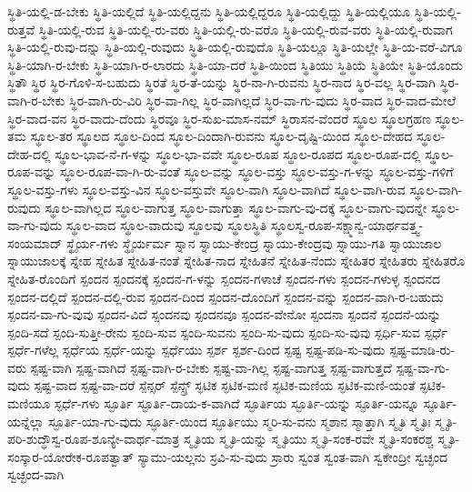 {ಸ್ಥಿತಿ-ಯಲ್ಲಿ-ಡ-ಬೇಕು
ಸ್ಥಿತಿ-ಯಲ್ಲಿದೆ
ಸ್ಥಿತಿ-ಯಲ್ಲಿದ್ದನು
ಸ್ಥಿತಿ-ಯಲ್ಲಿದ್ದರೂ
ಸ್ಥಿತಿ-ಯಲ್ಲಿದ್ದು
ಸ್ಥಿತಿ-ಯಲ್ಲಿಯೂ
ಸ್ಥಿತಿ-ಯಲ್ಲಿ-ರುತ್ತವೆ
ಸ್ಥಿತಿ-ಯಲ್ಲಿ-ರುವ
ಸ್ಥಿತಿ-ಯಲ್ಲಿ-ರು-ವರು
ಸ್ಥಿತಿ-ಯಲ್ಲಿ-ರು-ವರೊ
ಸ್ಥಿತಿ-ಯಲ್ಲಿ-ರುವ-ವರು
ಸ್ಥಿತಿ-ಯಲ್ಲಿ-ರುವಾಗ
ಸ್ಥಿತಿ-ಯಲ್ಲಿ-ರುವು-ದನ್ನು
ಸ್ಥಿತಿ-ಯಲ್ಲಿ-ರುವುದು
ಸ್ಥಿತಿ-ಯಲ್ಲಿ-ರುವುದೊ
ಸ್ಥಿತಿ-ಯಲ್ಲೂ
ಸ್ಥಿತಿ-ಯಲ್ಲೇ
ಸ್ಥಿತಿ-ಯ-ವರೆ-ವಿಗೂ
ಸ್ಥಿತಿ-ಯಾಗಿ-ರ-ಬೇಕು
ಸ್ಥಿತಿ-ಯಾಗಿ-ರ-ಲಾರದು
ಸ್ಥಿತಿ-ಯಾ-ದರೆ
ಸ್ಥಿತಿ-ಯಿಂದ
ಸ್ಥಿತಿಯು
ಸ್ಥಿತಿಯೆ
ಸ್ಥಿತಿಯೇ
ಸ್ಥಿತಿ-ಯೊಂದು
ಸ್ಥಿತೌ
ಸ್ಥಿರ
ಸ್ಥಿರ-ಗೊಳಿ-ಸ-ಬಹುದು
ಸ್ಥಿರತೆ
ಸ್ಥಿರ-ತೆ-ಯನ್ನು
ಸ್ಥಿರ-ನಾ-ಗಿ-ರುವನು
ಸ್ಥಿರ-ನಾದ
ಸ್ಥಿರ-ವಲ್ಲ
ಸ್ಥಿರ-ವಾಗಿ
ಸ್ಥಿರ-ವಾಗಿ-ರ-ಬೇಕು
ಸ್ಥಿರ-ವಾಗಿ-ರು-ವಿರಿ
ಸ್ಥಿರ-ವಾ-ಗಿಲ್ಲ
ಸ್ಥಿರ-ವಾಗಿಲ್ಲದೆ
ಸ್ಥಿರ-ವಾ-ಗು-ವುದು
ಸ್ಥಿರ-ವಾದ
ಸ್ಥಿರ-ವಾದ-ಮೇಲೆ
ಸ್ಥಿರ-ವಾದ-ವನ
ಸ್ಥಿರ-ವಾದು-ದೆಂದು
ಸ್ಥಿರವೂ
ಸ್ಥಿರ-ಸುಖ-ಮಾಸ-ನಮ್
ಸ್ಥಿರಾಸನ-ವೆಂದರೆ
ಸ್ಥೂಲ
ಸ್ಥೂಲಗ್ರಹಣ
ಸ್ಥೂಲ-ತಮ
ಸ್ಥೂಲ-ತರ
ಸ್ಥೂಲದ
ಸ್ಥೂಲ-ದಿಂದ
ಸ್ಥೂಲ-ದಿಂದಾಗಿ-ರುವನು
ಸ್ಥೂಲ-ದೃಷ್ಟಿ-ಯಿಂದ
ಸ್ಥೂಲ-ದೇಹದ
ಸ್ಥೂಲ-ದೇಹ-ದಲ್ಲಿ
ಸ್ಥೂಲ-ಭಾವ-ನೆ-ಗ-ಳನ್ನು
ಸ್ಥೂಲ-ಭಾ-ವವೇ
ಸ್ಥೂಲ-ರೂಪ
ಸ್ಥೂಲ-ರೂಪದ
ಸ್ಥೂಲ-ರೂಪ-ದಲ್ಲಿ
ಸ್ಥೂಲ-ರೂಪ-ವನ್ನು
ಸ್ಥೂಲ-ರೂಪ-ವಾ-ಗಿ-ರು-ವಂತೆ
ಸ್ಥೂಲ-ವನ್ನು
ಸ್ಥೂಲ-ವಸ್ತು
ಸ್ಥೂಲ-ವಸ್ತು-ಗ-ಳನ್ನು
ಸ್ಥೂಲ-ವಸ್ತು-ಗಳಿಗೆ
ಸ್ಥೂಲ-ವಸ್ತು-ಗಳು
ಸ್ಥೂಲ-ವಸ್ತು-ವಿನ
ಸ್ಥೂಲ-ವಸ್ತುವೇ
ಸ್ಥೂಲ-ವಾಗಿ
ಸ್ಥೂಲ-ವಾಗಿದೆ
ಸ್ಥೂಲ-ವಾಗಿ-ರುವ
ಸ್ಥೂಲ-ವಾಗಿ-ರುವುದು
ಸ್ಥೂಲ-ವಾಗಿಲ್ಲದ
ಸ್ಥೂಲ-ವಾಗುತ್ತ
ಸ್ಥೂಲ-ವಾಗುತ್ತಾ
ಸ್ಥೂಲ-ವಾಗು-ವು-ದಕ್ಕೆ
ಸ್ಥೂಲ-ವಾಗು-ವುದನ್ನೇ
ಸ್ಥೂಲ-ವಾ-ಗು-ವುದು
ಸ್ಥೂಲ-ವಾದ
ಸ್ಥೂಲ-ವಾದುವು
ಸ್ಥೂಲವು
ಸ್ಥೂಲಸ್ಥಿತಿ
ಸ್ಥೂಲಸ್ವ-ರೂಪ-ಸಕ್ಷ್ಮಾನ್ವ-ಯಾರ್ಥವತ್ತ್ವ-ಸಂಯಮಾದ್
ಸ್ಥೈರ್ಯ-ಗಳು
ಸ್ಥೈರ್ಯರ್ಮ
ಸ್ನಾನ
ಸ್ನಾಯು-ಕೇಂದ್ರ
ಸ್ನಾಯು-ಕೇಂದ್ರವು
ಸ್ನಾಯು-ಗತಿ
ಸ್ನಾಯುಜಾಲ
ಸ್ನಾಯುಜಾಲಕ್ಕೆ
ಸ್ನೇಹ
ಸ್ನೇಹಿತ
ಸ್ನೇಹಿತ-ನಂತೆ
ಸ್ನೇಹಿತ-ನಾದ
ಸ್ನೇಹಿತನೆ
ಸ್ನೇಹಿತ-ನೆಂದು
ಸ್ನೇಹಿತರ
ಸ್ನೇಹಿತರು
ಸ್ನೇಹಿತರೊ
ಸ್ನೇಹಿತ-ರೊಂದಿಗೆ
ಸ್ಪಂದನ
ಸ್ಪಂದನಕ್ಕೆ
ಸ್ಪಂದನ-ಗ-ಳನ್ನು
ಸ್ಪಂದನ-ಗಳಾಚೆ
ಸ್ಪಂದನ-ಗಳು
ಸ್ಪಂದನ-ಗಳುಳ್ಳ
ಸ್ಪಂದನದ
ಸ್ಪಂದನ-ದಲ್ಲಿದೆ
ಸ್ಪಂದನ-ದಲ್ಲಿ-ರುವ
ಸ್ಪಂದನ-ದಿಂದ
ಸ್ಪಂದನ-ದೊಂದಿಗೆ
ಸ್ಪಂದನ-ವನ್ನು
ಸ್ಪಂದನ-ವಾಗಿ-ರ-ಬಹುದು
ಸ್ಪಂದನ-ವಾ-ಗು-ವುವು
ಸ್ಪಂದನ-ವಿದೆ
ಸ್ಪಂದನವು
ಸ್ಪಂದನವೂ
ಸ್ಪಂದನ-ವೇನೋ
ಸ್ಪಂದನಾ
ಸ್ಪಂದನೆ
ಸ್ಪಂದನೆ-ಯನ್ನು
ಸ್ಪಂದಿ-ಸದೆ
ಸ್ಪಂದಿ-ಸುತ್ತೀ-ರೇನು
ಸ್ಪಂದಿ-ಸುವ
ಸ್ಪಂದಿ-ಸುವನು
ಸ್ಪಂದಿ-ಸು-ವುದು
ಸ್ಪಂದಿ-ಸು-ವುವು
ಸ್ಪರ್ಧಿ-ಸುವ
ಸ್ಪರ್ಧೆ
ಸ್ಪರ್ಧೆ-ಗಳೆಲ್ಲ
ಸ್ಪರ್ಧೆಯ
ಸ್ಪರ್ಧೆ-ಯನ್ನು
ಸ್ಪರ್ಧೆಯು
ಸ್ಪರ್ಶ
ಸ್ಪರ್ಶ-ದಿಂದ
ಸ್ಪಷ್ಟ
ಸ್ಪಷ್ಟ-ಪಡಿ-ಸು-ವುದು
ಸ್ಪಷ್ಟ-ಮಾಡಿ-ರು-ವರು
ಸ್ಪಷ್ಟ-ವಾಗಿ
ಸ್ಪಷ್ಟ-ವಾಗಿದೆ
ಸ್ಪಷ್ಟ-ವಾಗಿ-ರ-ಬೇಕು
ಸ್ಪಷ್ಟ-ವಾ-ಗಿಲ್ಲ
ಸ್ಪಷ್ಟ-ವಾಗುತ್ತ
ಸ್ಪಷ್ಟ-ವಾಗುತ್ತದೆ
ಸ್ಪಷ್ಟ-ವಾ-ಗು-ವುದು
ಸ್ಪಷ್ಟ-ವಾದ
ಸ್ಪಷ್ಟ-ವಾ-ದರೆ
ಸ್ಪೆನ್ಸರ್
ಸ್ಪೆನ್ಸ್ರ್
ಸ್ಫಟಿಕ
ಸ್ಫಟಿಕ-ಮಣಿ
ಸ್ಫಟಿಕ-ಮಣಿಯ
ಸ್ಫಟಿಕ-ಮಣಿ-ಯಂತೆ
ಸ್ಫಟಿಕ-ಮಣಿಯೂ
ಸ್ಫರ್ಧೆ-ಗಳು
ಸ್ಫೂರ್ತಿ
ಸ್ಫೂರ್ತಿ-ದಾಯ-ಕ-ವಾಗಿದೆ
ಸ್ಫೂರ್ತಿಯ
ಸ್ಫೂರ್ತಿ-ಯನ್ನು
ಸ್ಫೂರ್ತಿ-ಯನ್ನೂ
ಸ್ಫೂರ್ತಿ-ಯನ್ನೆಲ್ಲಾ
ಸ್ಫೂರ್ತಿ-ಯಾ-ಗು-ವುದು
ಸ್ಫೂರ್ತಿ-ಯಿಂದ
ಸ್ಫೂರ್ತಿಯು
ಸ್ಮರಿ-ಸು-ವನು
ಸ್ಮಶಾನ
ಸ್ಮಾತ್ತಾಗಿ
ಸ್ಮೃತಿ
ಸ್ಮೃತಿಃ
ಸ್ಮೃತಿ-ಪರಿ-ಶುದ್ಧೌಸ್ವ-ರೂಪ-ಶೂನ್ಯೇ-ವಾರ್ಥ-ಮಾತ್ರ
ಸ್ಮೃತಿಯ
ಸ್ಮೃತಿ-ಯನ್ನು
ಸ್ಮೃತಿಯು
ಸ್ಮೃತಿ-ಸಂಕ-ರವೇ
ಸ್ಮೃತಿ-ಸಂಕರಶ್ಚ
ಸ್ಮೃತಿ-ಸಂಸ್ಕಾರ-ಯೋರೇಕ-ರೂಪತ್ವಾತ್
ಸ್ಯಾಮು-ಯಲ್ಲನು
ಸ್ರವಿ-ಸು-ವುದು
ಸ್ರಾರು
ಸ್ವಂತ
ಸ್ವಂತ-ವಾಗಿ
ಸ್ವಕೇಂದ್ರೀ
ಸ್ವಚ್ಛಂದ
ಸ್ವಚ್ಛಂದ-ವಾಗಿ
}
